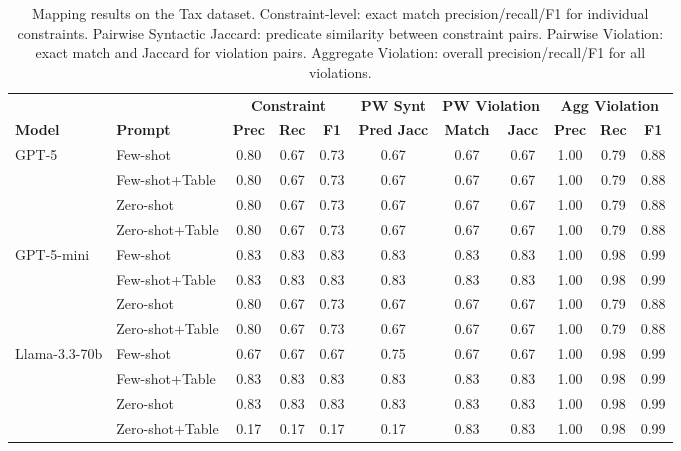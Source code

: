 \begin{table}[htbp]
\centering
\small
\caption{Mapping results on the Tax dataset. Constraint-level: exact match precision/recall/F1 for individual constraints. Pairwise Syntactic Jaccard: predicate similarity between constraint pairs. Pairwise Violation: exact match and Jaccard for violation pairs. Aggregate Violation: overall precision/recall/F1 for all violations.}
\label{tab:mapping_results_tax}
\begin{tabular}{@{}llccccccccc@{}}
\toprule
 & & \multicolumn{3}{c}{\textbf{Constraint}} & \textbf{PW Synt} & \multicolumn{2}{c}{\textbf{PW Violation}} & \multicolumn{3}{c}{\textbf{Agg Violation}} \\
\cmidrule(lr){3-5} \cmidrule(lr){6-6} \cmidrule(lr){7-8} \cmidrule(lr){9-11}
\textbf{Model} & \textbf{Prompt} & \textbf{Prec} & \textbf{Rec} & \textbf{F1} & \textbf{Pred Jacc} & \textbf{Match} & \textbf{Jacc} & \textbf{Prec} & \textbf{Rec} & \textbf{F1} \\
\midrule
\multirow{4}{*}{GPT-5} & Few-shot & 0.80 & 0.67 & 0.73 & 0.67 & 0.67 & 0.67 & 1.00 & 0.79 & 0.88 \\
 & Few-shot+Table & 0.80 & 0.67 & 0.73 & 0.67 & 0.67 & 0.67 & 1.00 & 0.79 & 0.88 \\
 & Zero-shot & 0.80 & 0.67 & 0.73 & 0.67 & 0.67 & 0.67 & 1.00 & 0.79 & 0.88 \\
 & Zero-shot+Table & 0.80 & 0.67 & 0.73 & 0.67 & 0.67 & 0.67 & 1.00 & 0.79 & 0.88 \\
\cmidrule(lr){1-11}
\multirow{4}{*}{GPT-5-mini} & Few-shot & 0.83 & 0.83 & 0.83 & 0.83 & 0.83 & 0.83 & 1.00 & 0.98 & 0.99 \\
 & Few-shot+Table & 0.83 & 0.83 & 0.83 & 0.83 & 0.83 & 0.83 & 1.00 & 0.98 & 0.99 \\
 & Zero-shot & 0.80 & 0.67 & 0.73 & 0.67 & 0.67 & 0.67 & 1.00 & 0.79 & 0.88 \\
 & Zero-shot+Table & 0.80 & 0.67 & 0.73 & 0.67 & 0.67 & 0.67 & 1.00 & 0.79 & 0.88 \\
\cmidrule(lr){1-11}
\multirow{4}{*}{Llama-3.3-70b} & Few-shot & 0.67 & 0.67 & 0.67 & 0.75 & 0.67 & 0.67 & 1.00 & 0.98 & 0.99 \\
 & Few-shot+Table & 0.83 & 0.83 & 0.83 & 0.83 & 0.83 & 0.83 & 1.00 & 0.98 & 0.99 \\
 & Zero-shot & 0.83 & 0.83 & 0.83 & 0.83 & 0.83 & 0.83 & 1.00 & 0.98 & 0.99 \\
 & Zero-shot+Table & 0.17 & 0.17 & 0.17 & 0.17 & 0.83 & 0.83 & 1.00 & 0.98 & 0.99 \\

\end{tabular}
\end{table}
